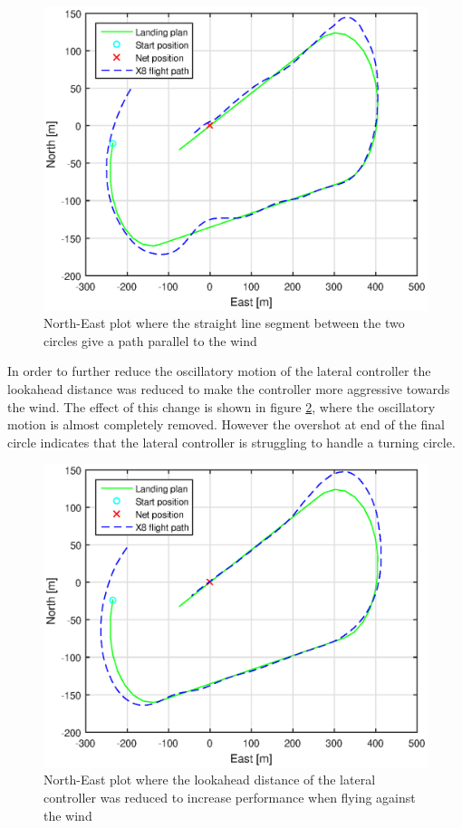 \begin{figure}[H]
	\centering
	\includegraphics[scale=0.7]{figs/Experiment/NorthEast31mai125420.eps}
	\caption{North-East plot where the straight line segment between the two circles give a path parallel to the wind}
	\label{Fig:NorthEast31mai125420}
\end{figure}
In order to further reduce the oscillatory motion of the lateral controller the lookahead distance was reduced to make the controller more aggressive towards the wind. The effect of this change is shown in figure \ref{Fig:NorthEast31mai131844}, where the oscillatory motion is almost completely removed. However the overshot at end of the final circle indicates that the lateral controller is struggling to handle a turning circle. 
\begin{figure}[H]
\centering
\includegraphics[scale=0.7]{figs/Experiment/NorthEast31mai131844.eps}
\caption{North-East plot where the lookahead distance of the lateral controller was reduced to increase performance when flying against the wind}
\label{Fig:NorthEast31mai131844}
\end{figure}
